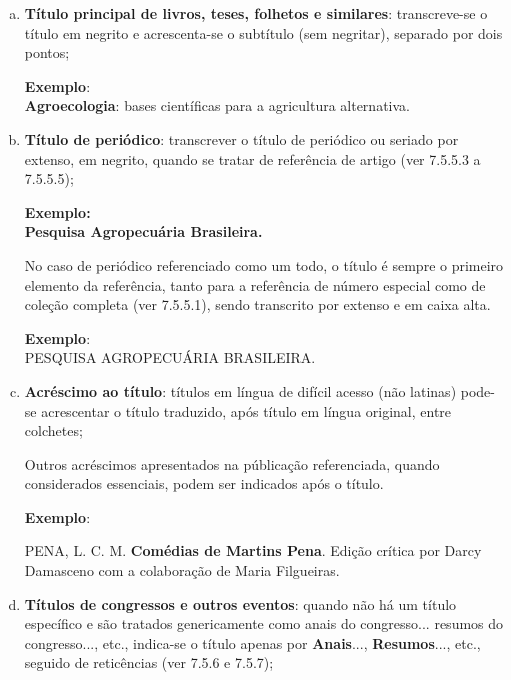 \begin{enumerate}[a)]
  \item  \textbf{Título principal de livros, teses, folhetos e similares}: transcreve-se o título em negrito e acrescenta-se o subtítulo (sem negritar), separado por dois pontos;

\begin{exemplomanuallista}  
\textbf{Exemplo}:\\
\textbf{Agroecologia}: bases científicas para a agricultura alternativa.
\end{exemplomanuallista}

  \item  \textbf{Título de periódico}: transcrever o título de periódico ou seriado por extenso, em negrito, quando se tratar de referência de artigo (ver 7.5.5.3 a 7.5.5.5);

\begin{exemplomanuallista}  
\textbf{Exemplo:\\
Pesquisa Agropecuária Brasileira.}
\end{exemplomanuallista}  

No caso de periódico referenciado como um todo, o título é sempre o primeiro elemento da referência, tanto para a referência de número especial como de coleção completa (ver 7.5.5.1), sendo transcrito por extenso e em caixa alta.

\begin{exemplomanuallista}
\textbf{Exemplo}:\\
PESQUISA AGROPECUÁRIA BRASILEIRA.
\end{exemplomanuallista}

  \item  \textbf{Acréscimo ao título}: títulos em língua de difícil acesso (não latinas) pode-se acrescentar o título traduzido, após título em língua original, entre colchetes;
  
Outros acréscimos apresentados na públicação referenciada, quando considerados essenciais, podem ser indicados após o título.

\begin{exemplomanuallista}
\textbf{Exemplo}:\\
\begin{singlespace}
PENA, L. C. M. \textbf{Comédias de Martins Pena}. Edição crítica por Darcy Damasceno com a colaboração de Maria Filgueiras.
\end{singlespace}
\end{exemplomanuallista}

  \item  \textbf{Títulos de congressos e outros eventos}: quando não há um título específico e são tratados genericamente como anais do congresso... resumos do congresso..., etc., indica-se o título apenas por \textbf{Anais}...,  \textbf{Resumos}..., etc., seguido de reticências (ver 7.5.6 e 7.5.7);
  

\end{enumerate}
